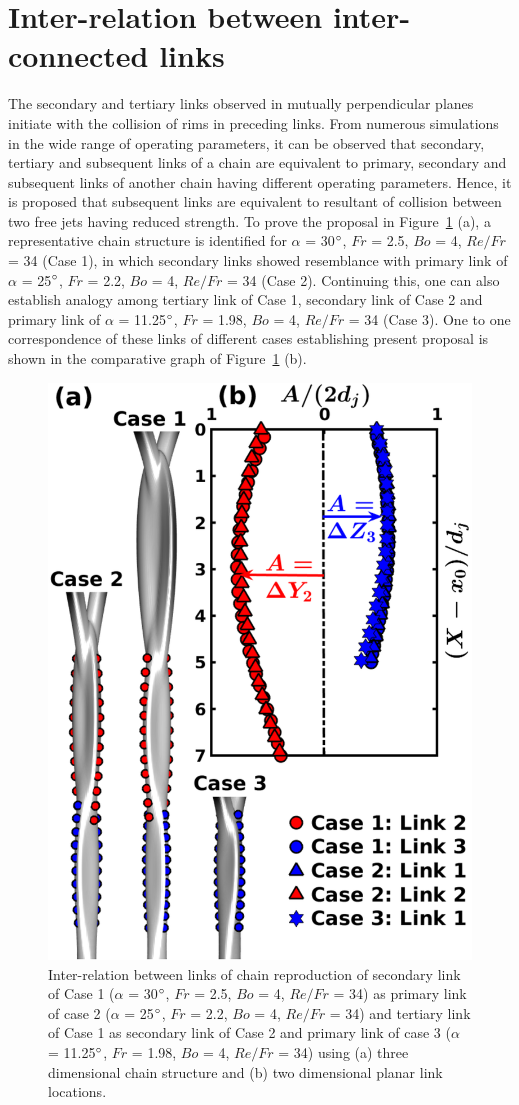 \section{Inter-relation between inter-connected links}
The secondary and tertiary links observed in mutually perpendicular planes initiate with the collision of rims in preceding links. From numerous simulations in the wide range of operating parameters, it can be observed that secondary, tertiary and subsequent links of a chain are equivalent to primary, secondary and subsequent links of another chain having different operating parameters. Hence, it is proposed that subsequent links are equivalent to resultant of collision between two free jets having reduced strength. To prove the proposal in Figure~\ref{Figure::secondCollision} (a), a representative chain structure is identified for $\alpha$ = 30$\degree$, $Fr$ = 2.5, $Bo$ = 4, $Re/Fr$ = 34 (Case 1), in which secondary links showed resemblance with primary link of $\alpha$ = 25$\degree$, $Fr$ = 2.2, $Bo$ = 4, $Re/Fr$ = 34 (Case 2). Continuing this, one can also establish analogy among tertiary link of Case 1, secondary link of Case 2 and primary link of $\alpha$ = 11.25$\degree$, $Fr$ = 1.98, $Bo$ = 4, $Re/Fr$ = 34 (Case 3). One to one correspondence of these links of different cases establishing present proposal is shown in the comparative graph of Figure~\ref{Figure::secondCollision} (b). \\
\begin{figure}
    \centering
    \includegraphics[width=0.4\linewidth]{chapters/jetJet/Figure11}
    \caption{Inter-relation between links of chain reproduction of secondary link of Case 1 ($\alpha$ = 30$\degree$, $Fr$ = 2.5, $Bo$ = 4, $Re/Fr$ = 34) as primary link of case 2 ($\alpha$ = 25$\degree$, $Fr$ = 2.2, $Bo$ = 4, $Re/Fr$ = 34) and tertiary link of Case 1 as secondary link of Case 2 and primary link of case 3 ($\alpha$ = 11.25$\degree$, $Fr$ = 1.98, $Bo$ = 4, $Re/Fr$ = 34) using (a) three dimensional chain structure and (b) two dimensional planar link locations.}
    \label{Figure::secondCollision}
\end{figure}
